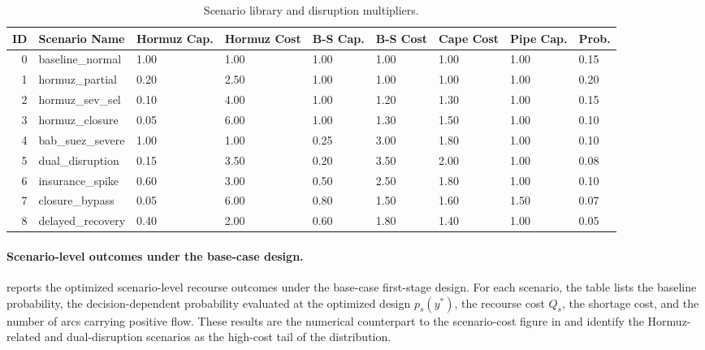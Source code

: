 \documentclass[final,3p,authoryear]{elsarticle}
\theoremstyle{definition}
\begin{document}
\begin{table}
\centering
\caption{Scenario library and disruption multipliers.}
\label{tab:tab01_scenario_library}
\small
\begin{tabularx}{\linewidth}{rlXXXXXXX}
\toprule
\textbf{ID} & \textbf{Scenario Name} & \textbf{Hormuz Cap.} & \textbf{Hormuz Cost} & \textbf{B-S Cap.} & \textbf{B-S Cost} & \textbf{Cape Cost} & \textbf{Pipe Cap.} & \textbf{Prob.} \\
\midrule
0 & baseline\_normal & 1.00 & 1.00 & 1.00 & 1.00 & 1.00 & 1.00 & 0.15 \\
1 & hormuz\_partial & 0.20 & 2.50 & 1.00 & 1.00 & 1.00 & 1.00 & 0.20 \\
2 & hormuz\_sev\_sel & 0.10 & 4.00 & 1.00 & 1.20 & 1.30 & 1.00 & 0.15 \\
3 & hormuz\_closure & 0.05 & 6.00 & 1.00 & 1.30 & 1.50 & 1.00 & 0.10 \\
4 & bab\_suez\_severe & 1.00 & 1.00 & 0.25 & 3.00 & 1.80 & 1.00 & 0.10 \\
5 & dual\_disruption & 0.15 & 3.50 & 0.20 & 3.50 & 2.00 & 1.00 & 0.08 \\
6 & insurance\_spike & 0.60 & 3.00 & 0.50 & 2.50 & 1.80 & 1.00 & 0.10 \\
7 & closure\_bypass & 0.05 & 6.00 & 0.80 & 1.50 & 1.60 & 1.50 & 0.07 \\
8 & delayed\_recovery & 0.40 & 2.00 & 0.60 & 1.80 & 1.40 & 1.00 & 0.05 \\
\bottomrule
\end{tabularx}
\end{table}

\paragraph{Scenario-level outcomes under the base-case design.}
 reports the optimized scenario-level
recourse outcomes under the base-case first-stage design. For each
scenario, the table lists the baseline probability, the
decision-dependent probability evaluated at the optimized design
$p_s(y^*)$, the recourse cost $Q_s$, the shortage cost, and the number
of arcs carrying positive flow. These results are the numerical
counterpart to the scenario-cost figure in  and
identify the Hormuz-related and dual-disruption scenarios as the
high-cost tail of the distribution.
\end{document}
